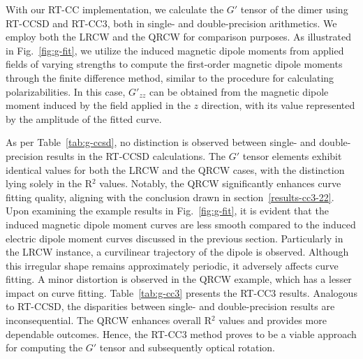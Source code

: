 With our RT-CC implementation, we calculate the $G'$ tensor of the  dimer using RT-CCSD and RT-CC3, both in single- and double-precision arithmetics. We employ both the LRCW and the QRCW for comparison purposes. As illustrated in Fig.~\ref{fig:g-fit}, we utilize the induced magnetic dipole moments from applied fields of varying strengths to compute the first-order magnetic dipole moments through the finite difference method, similar to the procedure for calculating polarizabilities. In this case, $G'_{zz}$ can be obtained from the magnetic dipole moment induced by the field applied in the $z$ direction, with its value represented by the amplitude of the fitted curve.

As per Table~\ref{tab:g-ccsd}, no distinction is observed between single- and double-precision results in the RT-CCSD calculations. The $G'$ tensor elements exhibit identical values for both the LRCW and the QRCW cases, with the distinction lying solely in the R$^{2}$ values. Notably, the QRCW significantly enhances curve fitting quality, aligning with the conclusion drawn in section~\ref{results-cc3-22}. Upon examining the example results in Fig.~\ref{fig:g-fit}, it is evident that the induced magnetic dipole moment curves are less smooth compared to the induced electric dipole moment curves discussed in the previous section. Particularly in the LRCW instance, a curvilinear trajectory of the dipole is observed. Although this irregular shape remains approximately periodic, it adversely affects curve fitting. A minor distortion is observed in the QRCW example, which has a lesser impact on curve fitting. Table~\ref{tab:g-cc3} presents the RT-CC3 results. Analogous to RT-CCSD, the disparities between single- and double-precision results are inconsequential. The QRCW enhances overall R$^{2}$ values and provides more dependable outcomes. Hence, the RT-CC3 method proves to be a viable approach for computing the $G'$ tensor and subsequently optical rotation.
